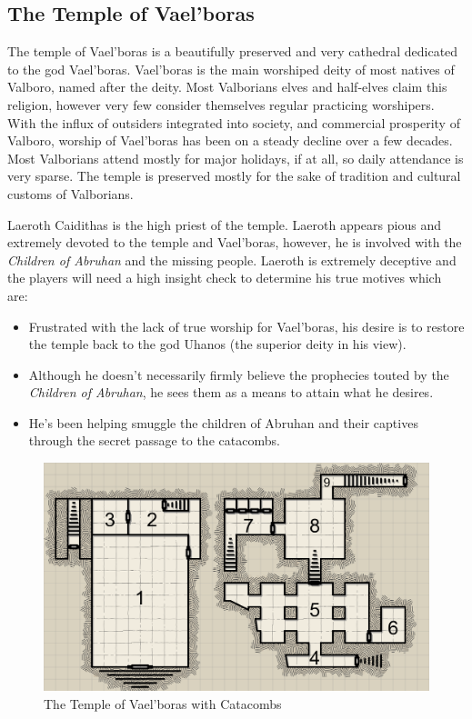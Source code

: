 \begin{multicols*}{2}
\subsection{The Temple of Vael'boras}
The temple of Vael'boras is a beautifully preserved and very cathedral dedicated to the god Vael'boras. Vael'boras is the main worshiped deity of most natives of Valboro, named after the deity. Most Valborians elves and half-elves claim this religion, however very few consider themselves regular practicing worshipers. With the influx of outsiders integrated into society, and commercial prosperity of Valboro, worship of Vael'boras has been on a steady decline over a few decades. Most Valborians attend mostly for major holidays, if at all, so daily attendance is very sparse. The temple is preserved mostly for the sake of tradition and cultural customs of Valborians.

Laeroth Caidithas is the high priest of the temple. Laeroth appears pious and extremely devoted to the temple and Vael'boras, however, he is involved with the \emph{Children of Abruhan} and the missing people. Laeroth is extremely deceptive and the players will need a high insight check to determine his true motives which are:

\begin{itemize}
	\item Frustrated with the lack of true worship for Vael'boras, his desire is to restore the temple back to the god Uhanos (the superior deity in his view).
	\item Although he doesn't necessarily firmly believe the prophecies touted by the \emph{Children of Abruhan}, he sees them as a means to attain what he desires.
	\item He's been helping smuggle the children of Abruhan and their captives through the secret passage to the catacombs.   
\end{itemize}

\begin{figure}
	\centering
	\includegraphics[width=\textwidth]{images/vaelboras_temple}
	\caption{The Temple of Vael'boras with Catacombs}
\end{figure}


\end{multicols*}
